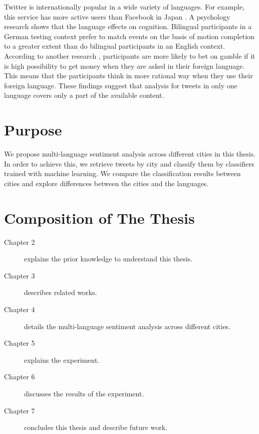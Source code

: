Twitter is internationally popular in a wide variety of languages.
For example, this service has more active users than Facebook in Japan \cite{japan_twitter}.
A psychology research \cite{psychology1} shows that the language effects on cognition.
Bilingual participants in a German testing context prefer to match events on the basis of motion completion to a greater extent than do bilingual participants in an English context.
According to another research \cite{psychology2}, participants are more likely to bet on gamble if it is high possibility to get money when they are asked in their foreign language.
This means that the participants think in more rational way when they use their foreign language.
These findings suggest that analysis for tweets in only one language covers only a part of the available content.

\section{Purpose}
We propose multi-language sentiment analysis across different cities in this thesis.
In order to achieve this, we retrieve tweets by city and classify them by classifiers trained with machine learning. 
We compare the classification results between cities and explore differences between the cities and the languages. 

\section{Composition of The Thesis}

\begin{description}
 \item[Chapter 2] explains the prior knowledge to understand this thesis.
 \item[Chapter 3] describes related works.
 \item[Chapter 4] details the multi-language sentiment analysis across different cities.
 \item[Chapter 5] explains the experiment.
 \item[Chapter 6] discusses the results of the experiment.
 \item[Chapter 7] concludes this thesis and describe future work.
\end{description}

